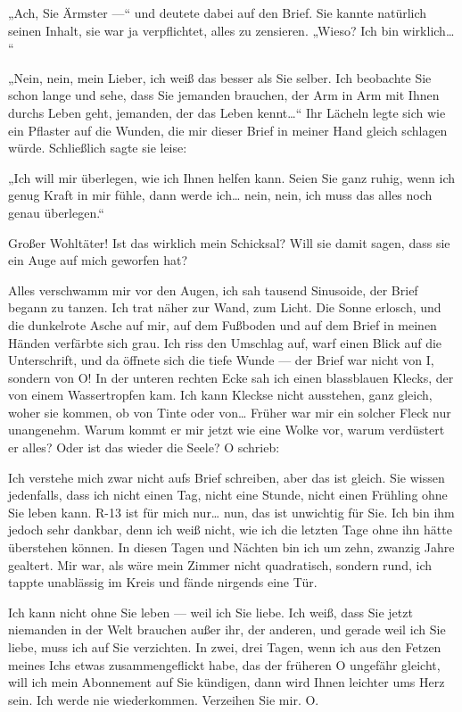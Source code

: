 „Ach, Sie Ärmster —“ und deutete dabei auf den Brief. Sie kannte
natürlich seinen Inhalt, sie war ja verpflichtet, alles zu
zensieren. „Wieso? Ich bin wirklich\ldots{} “

„Nein, nein, mein Lieber, ich weiß das besser als Sie selber. Ich
beobachte Sie schon lange und sehe, dass Sie jemanden brauchen, der
Arm in Arm mit Ihnen durchs Leben geht, jemanden, der das Leben
kennt\ldots{}“ Ihr Lächeln legte sich wie ein Pflaster auf die Wunden,
die mir dieser Brief in meiner Hand gleich schlagen würde.
Schließlich sagte sie leise:

„Ich will mir überlegen, wie ich Ihnen helfen kann. Seien Sie ganz
ruhig, wenn ich genug Kraft in mir fühle, dann werde ich\ldots{} nein,
nein, ich muss das alles noch genau überlegen.“

Großer Wohltäter! Ist das wirklich mein Schicksal? Will sie damit
sagen, dass sie ein Auge auf mich geworfen hat?

Alles verschwamm mir vor den Augen, ich sah tausend Sinusoide, der
Brief begann zu tanzen. Ich trat näher zur Wand, zum Licht. Die
Sonne erlosch, und die dunkelrote Asche auf mir, auf dem Fußboden
und auf dem Brief in meinen Händen verfärbte sich grau. Ich riss
den Umschlag auf, warf einen Blick auf die Unterschrift, und da
öffnete sich die tiefe Wunde — der Brief war nicht von I, sondern
von O! In der unteren rechten Ecke sah ich einen blassblauen
Klecks, der von einem Wassertropfen kam. Ich kann Kleckse nicht
ausstehen, ganz gleich, woher sie kommen, ob von Tinte oder von\ldots{}
Früher war mir ein solcher Fleck nur unangenehm. Warum kommt er mir
jetzt wie eine Wolke vor, warum verdüstert er alles? Oder ist das
wieder die Seele? O schrieb:

Ich verstehe mich zwar nicht aufs Brief schreiben, aber das ist
gleich. Sie wissen jedenfalls, dass ich nicht einen Tag, nicht eine
Stunde, nicht einen Frühling ohne Sie leben kann. R-13 ist für mich
nur\ldots{} nun, das ist unwichtig für Sie. Ich bin ihm jedoch sehr
dankbar, denn ich weiß nicht, wie ich die letzten Tage ohne ihn
hätte überstehen können. In diesen Tagen und Nächten bin ich um
zehn, zwanzig Jahre gealtert. Mir war, als wäre mein Zimmer nicht
quadratisch, sondern rund, ich tappte unablässig im Kreis und fände
nirgends eine Tür.

Ich kann nicht ohne Sie leben — weil ich Sie liebe. Ich weiß, dass
Sie jetzt niemanden in der Welt brauchen außer ihr, der anderen,
und gerade weil ich Sie liebe, muss ich auf Sie verzichten. In
zwei, drei Tagen, wenn ich aus den Fetzen meines Ichs etwas
zusammengeflickt habe, das der früheren O ungefähr gleicht, will
ich mein Abonnement auf Sie kündigen, dann wird Ihnen leichter ums
Herz sein. Ich werde nie wiederkommen. Verzeihen Sie mir. O.

